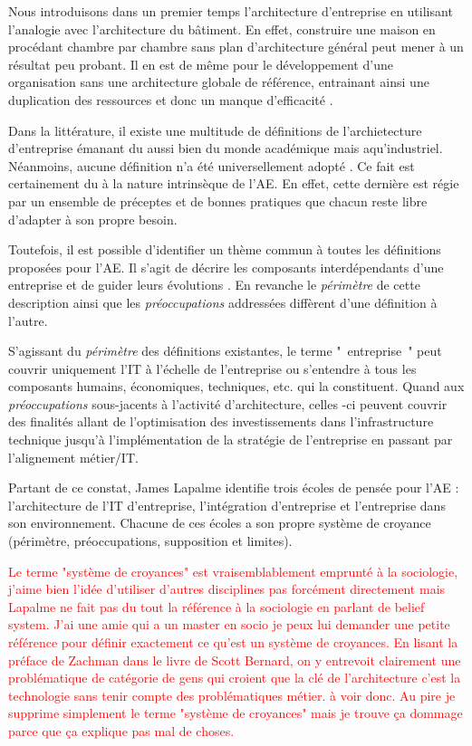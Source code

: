 Nous introduisons dans un premier temps l'architecture d'entreprise en utilisant 
l'analogie avec l'architecture du bâtiment. En effet, construire une maison en 
procédant chambre par chambre sans plan d'architecture général peut mener à un 
résultat peu probant. Il en est de même pour le développement d'une organisation 
sans une architecture globale de référence, entrainant ainsi une duplication des 
ressources et donc un manque d'efficacité \cite{bernard2012introduction}.

Dans la littérature, il existe une multitude de définitions de l'archietecture 
d'entreprise émanant du aussi bien du monde académique mais aqu'industriel. 
Néanmoins, aucune définition n'a été universellement adopté 
\cite{mentz2012comparison} \cite{ranganathan2005enterprise}. Ce fait est 
certainement du à la nature intrinsèque de l'AE. En effet, cette dernière est 
régie par un ensemble de préceptes et de bonnes pratiques que chacun reste libre 
d'adapter à son propre besoin. 

Toutefois, il est possible d'identifier un thème commun à toutes les définitions 
proposées pour l'AE. Il s'agit de décrire les composants interdépendants d'une 
entreprise et de guider leurs évolutions \cite{lapalme2012three}. En revanche le 
\textit{périmètre} de cette description ainsi que les \textit{préoccupations} 
addressées  diffèrent d'une définition à l'autre.

S'agissant du \textit{périmètre} des définitions existantes, le terme 
"~entreprise~" peut couvrir uniquement l'IT à l'échelle de l'entreprise ou 
s'entendre à tous les composants humains, économiques, techniques, etc. qui la 
constituent. Quand aux \textit{préoccupations} sous-jacents à l'activité 
d'architecture, celles -ci peuvent couvrir des finalités allant de 
l'optimisation des investissements dans l'infrastructure technique jusqu'à 
l'implémentation de la stratégie de l'entreprise en passant par l'alignement 
métier/IT. 

Partant de ce constat, James Lapalme identifie trois écoles de pensée pour l'AE 
\cite{lapalme2012three} : l'architecture de l'IT d'entreprise, l'intégration 
d'entreprise et l'entreprise dans son environnement. Chacune de ces écoles a son 
propre système de croyance (périmètre, préoccupations, supposition et limites).


\textcolor{red}{Le terme "système de croyances" est vraisemblablement emprunté à 
la  sociologie, j'aime bien l'idée d'utiliser d'autres disciplines pas forcément 
directement mais Lapalme ne fait pas du tout la référence à la sociologie en 
parlant de belief system. J'ai une amie qui a un master en socio je peux lui 
demander une petite référence pour définir exactement ce qu'est un système de 
croyances. En lisant la préface de Zachman dans le livre de Scott Bernard, on y 
entrevoit clairement une problématique de catégorie de gens qui croient que la 
clé de l'architecture c'est la technologie sans  tenir compte des problématiques 
métier. à voir donc. Au pire je supprime simplement le terme "système de 
croyances" mais je trouve ça dommage parce que ça explique pas mal de choses.}

